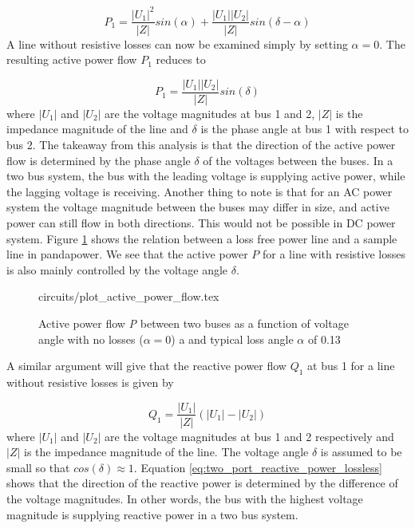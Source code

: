 \documentclass[class=book, crop=false]{standalone}
\begin{document}
\begin{equation}\label{eq:two_port_active_power_good}
P_{1} = \frac{|U_{1}|^2}{|Z|}sin(\alpha) + \frac{|U_{1}||U_{2}|}{|Z|}sin(\delta -\alpha)
\end{equation}
A line without resistive losses can now be examined simply by setting $\alpha = 0$. The resulting active power flow $P_{1}$ reduces to

\begin{equation}\label{eq:two_port_active_power_lossless}
P_{1} =  \frac{|U_{1}||U_{2}|}{|Z|}sin(\delta)
\end{equation}
where $|U_{1}|$ and $|U_{2}|$ are the voltage magnitudes at bus 1 and 2, $|Z|$ is the impedance magnitude of the line and $\delta$ is the phase angle at bus 1 with respect to bus 2. The takeaway from this analysis is that the direction of the active power flow is determined by the phase angle $\delta$ of the voltages between the buses. In a two bus system, the bus with the leading voltage is supplying active power, while the lagging voltage is receiving. Another thing to note is that for an AC power system the voltage magnitude between the buses may differ in size, and active power can still flow in both directions. This would not be possible in DC power system. Figure \ref{fig:theory:active_power_flow} shows the relation between a loss free power line and a sample line in pandapower. We see that the active power $P$ for a line with resistive losses is also mainly controlled by the voltage angle $\delta$.


\begin{figure}[ht!]
    \center
    {circuits/plot_active_power_flow.tex}
    \caption[size = 9]{Active power flow \textit{P} between two buses as a function of voltage angle with no losses ($\alpha=0$) a and typical loss angle $\alpha$ of 0.13} \label{fig:theory:active_power_flow}
\end{figure}

A similar argument will give that the reactive power flow $Q_{1}$ at bus 1 for a line without resistive losses is given by 

\begin{equation}\label{eq:two_port_reactive_power_lossless}
Q_{1} =  \frac{|U_{1}|}{|Z|}(|U_{1}| - |U_{2}|)
\end{equation}
where $|U_{1}|$ and $|U_{2}|$ are the voltage magnitudes at bus 1 and 2 respectively and $|Z|$ is the impedance magnitude of the line. The voltage angle $\delta$ is assumed to be small so that $cos(\delta) \approx 1$. Equation \eqref{eq:two_port_reactive_power_lossless} shows that the direction of the reactive power is determined by the difference of the voltage magnitudes. In other words, the bus with the highest voltage magnitude is supplying reactive power in a two bus system.
\end{document}
